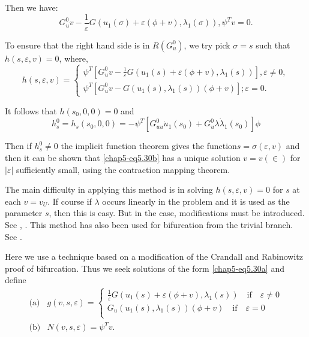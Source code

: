 Then we have:
\begin{equation*}
 G^{0}_{u}v - \frac{1}{\varepsilon} G(u_{1}(\sigma) + \varepsilon
 (\phi + v), \lambda_{1}(\sigma)), \psi^{T}v =
 0.\tag{5.30b}\label{chap5-eq5.30b}  
\end{equation*}\pageoriginale

To ensure that the right hand side is in $R(G^{0}_{u})$, we try pick
$\sigma = s$ such that $h(s, \varepsilon, v) = 0$, where,   
\begin{equation*}
h(s, \varepsilon, v) = 
\begin{cases} 
\psi^{T}[G^{0}_{u}v - \frac{1}{\varepsilon} G(u_{1}(s) + \varepsilon
  (\phi + v), \lambda_{1}(s))], \varepsilon \neq 0,\\ 
\psi^{T}[G^{0}_{u}v - G(u_{1}(s), \lambda_{1}(s))  (\phi + v)] ;
\varepsilon = 0. 
\end{cases}\tag{5.30c}\label{chap5-eq5.30c}
\end{equation*}

It follows that $h(s_{0}, 0, 0) = 0$ and 
$$
h^{0}_{s} = h_{s}(s_{0}, 0, 0) =
-\psi^{T}[G^{0}_{uu}\dot{u}_{1}(s_{0}) + G^{0}_{u} \lambda
  \dot{\lambda}_{1} (s_{0})] \phi 
$$

Then if $h^{0}_{s} \neq 0$ the implicit function theorem gives the
function\break $s = \sigma (\varepsilon, v)$ and then it can be shown that
\eqref{chap5-eq5.30b} has a unique solution $v = v(\in)$ for
$|\varepsilon|$ sufficiently small, using the contraction mapping
theorem. 

The main difficulty in applying this method is in solving $h(s,
\varepsilon, v) = 0$ for $s$ at each $v = v_U$. If course if
$\lambda$ occurs linearly in the problem and it is used as the
parameter $s$, then this is easy. But in the case, modifications must
be introduced. See \cite{key3}, \cite{key8}. 
This method has also been used for bifurcation from the trivial
branch. See \cite{key31}.   

\medskip
{}
Here we use a technique based on a modification of the Crandall and
Rabinowitz \cite{key5} proof of bifurcation. Thus we seek solutions of the
form \eqref{chap5-eq5.30a} and define  
\begin{equation*}
\begin{split}
\text{(a)} & g (v,s,\varepsilon)  =
\begin{cases}
\frac{1}{\varepsilon} G (u_1(s) + \varepsilon (\phi +v), \lambda_1
(s)) \quad \text{if} \quad \varepsilon \neq 0\\ 
G_u (u_1(s), \lambda_1 (s)) (\phi + v) \quad \text{if} \quad
\varepsilon  =0\\  
\end{cases}\\
\text{(b)} & N(v,s, \varepsilon)  = \psi^Tv.  
\end{split}\tag{5.31}\label{chap5-eq5.31}
\end{equation*}\pageoriginale

